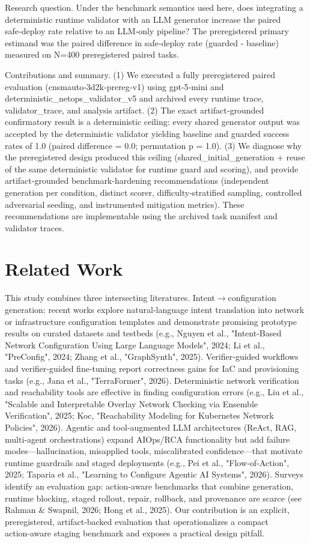 \documentclass[conference]{IEEEtran}
\begin{document}
Research question. Under the benchmark semantics used here, does integrating a deterministic runtime validator with an LLM generator increase the paired safe‑deploy rate relative to an LLM‑only pipeline? The preregistered primary estimand was the paired difference in safe‑deploy rate (guarded - baseline) measured on N=400 preregistered paired tasks.

Contributions and summary. (1) We executed a fully preregistered paired evaluation (cnsmauto‑3d2k‑prereg‑v1) using gpt‑5‑mini and deterministic\_netops\_validator\_v5 and archived every runtime trace, validator\_trace, and analysis artifact. (2) The exact artifact‑grounded confirmatory result is a deterministic ceiling: every shared generator output was accepted by the deterministic validator yielding baseline and guarded success rates of 1.0 (paired difference = 0.0; permutation p = 1.0). (3) We diagnose why the preregistered design produced this ceiling (shared\_initial\_generation + reuse of the same deterministic validator for runtime guard and scoring), and provide artifact‑grounded benchmark‑hardening recommendations (independent generation per condition, distinct scorer, difficulty‑stratified sampling, controlled adversarial seeding, and instrumented mitigation metrics). These recommendations are implementable using the archived task manifest and validator traces.

\section{Related Work}
This study combines three intersecting literatures. Intent\ensuremath{\rightarrow}configuration generation: recent works explore natural‑language intent translation into network or infrastructure configuration templates and demonstrate promising prototype results on curated datasets and testbeds (e.g., Nguyen et al., "Intent‑Based Network Configuration Using Large Language Models", 2024; Li et al., "PreConfig", 2024; Zhang et al., "GraphSynth", 2025). Verifier‑guided workflows and verifier‑guided fine‑tuning report correctness gains for IaC and provisioning tasks (e.g., Jana et al., "TerraFormer", 2026). Deterministic network verification and reachability tools are effective in finding configuration errors (e.g., Liu et al., "Scalable and Interpretable Overlay Network Checking via Ensemble Verification", 2025; Koc, "Reachability Modeling for Kubernetes Network Policies", 2026). Agentic and tool‑augmented LLM architectures (ReAct, RAG, multi‑agent orchestrations) expand AIOps/RCA functionality but add failure modes---hallucination, misapplied tools, miscalibrated confidence---that motivate runtime guardrails and staged deployments (e.g., Pei et al., "Flow‑of‑Action", 2025; Taparia et al., "Learning to Configure Agentic AI Systems", 2026). Surveys identify an evaluation gap: action‑aware benchmarks that combine generation, runtime blocking, staged rollout, repair, rollback, and provenance are scarce (see Rahman \& Swapnil, 2026; Hong et al., 2025). Our contribution is an explicit, preregistered, artifact‑backed evaluation that operationalizes a compact action‑aware staging benchmark and exposes a practical design pitfall.
\end{document}
